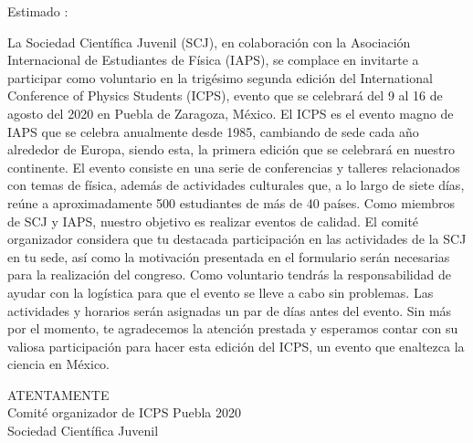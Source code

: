 \documentclass[letterpaper,12pt]{article}
\begin{document}
\BgThispage\vspace{15pt}

Estimado \firstName \lastName:\\ \vspace{15pt}



La Sociedad Científica Juvenil (SCJ), en colaboración con la Asociación Internacional de
Estudiantes de Física (IAPS), se complace en invitarte a participar como voluntario en la
trigésimo segunda edición del International Conference of Physics Students (ICPS),
evento que se celebrará del 9 al 16 de agosto del 2020 en Puebla de Zaragoza, México.
El ICPS es el evento magno de IAPS que se celebra anualmente desde 1985, cambiando
de sede cada año alrededor de Europa, siendo esta, la primera edición que se celebrará
en nuestro continente. El evento consiste en una serie de conferencias y talleres
relacionados con temas de física, además de actividades culturales que, a lo largo de
siete días, reúne a aproximadamente 500 estudiantes de más de 40 países.
Como miembros de SCJ y IAPS, nuestro objetivo es realizar eventos de calidad. El
comité organizador considera que tu destacada participación en las actividades de la
SCJ en tu sede, así como la motivación presentada en el formulario serán necesarias
para la realización del congreso. Como voluntario tendrás la responsabilidad de ayudar
con la logística para que el evento se lleve a cabo sin problemas. Las actividades y
horarios serán asignadas un par de días antes del evento.
Sin más por el momento, te agradecemos la atención prestada y esperamos contar con
su valiosa participación para hacer esta edición del ICPS, un evento que enaltezca la
ciencia en México.

\begin{center}
ATENTAMENTE \\ \vspace{10pt}
Comité organizador de ICPS Puebla 2020 \\ 
Sociedad Científica Juvenil \\
\end{center}
\end{document}
